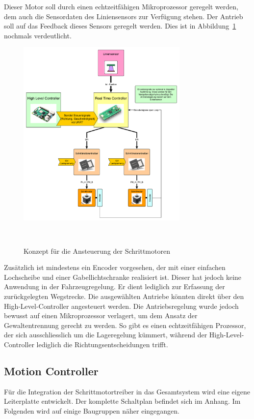\documentclass[main.  tex]{subfiles} %
\begin{document}
Dieser Motor soll durch einen echtzeitfähigen Mikroprozessor geregelt werden,
dem auch die Sensordaten des Liniensensors zur Verfügung stehen. Der Antrieb
soll auf das Feedback dieses Sensors geregelt werden. Dies ist in
Abbildung~\ref{fig:RTC_Trinamic_Konzept} nochmals verdeutlicht.
\begin{figure}[h!]
    \centering
    \includegraphics[width=0.75\textwidth]{./fig_Antriebe/Konzept_RTC_Trinamic.pdf}
    \caption{Konzept für die Ansteuerung der Schrittmotoren}~\label{fig:RTC_Trinamic_Konzept}
\end{figure}

Zusätzlich ist mindestens ein Encoder vorgesehen, der mit einer einfachen
Lochscheibe und einer Gabellichtschranke realisiert ist. Dieser hat jedoch
keine Anwendung in der Fahrzeugregelung. Er dient lediglich zur Erfassung der
zurückgelegten Wegstrecke. Die ausgewählten Antriebe könnten direkt über den
High-Level-Controller angesteuert werden. Die Antriebsregelung wurde jedoch
bewusst auf einen Mikroprozessor verlagert, um dem Ansatz der Gewaltentrennung
gerecht zu werden. So gibt es einen echtzeitfähigen Prozessor, der sich
ausschliesslich um die Lageregelung kümmert, während der High-Level-Controller
lediglich die Richtungsentscheidungen trifft.

\subsection*{Motion Controller} %

Für die Integration der Schrittmotortreiber in das Gesamtsystem wird eine
eigene Leiterplatte entwickelt. Der komplette Schaltplan befindet sich im
Anhang. Im Folgenden wird auf einige Baugruppen näher eingegangen.
\end{document}
